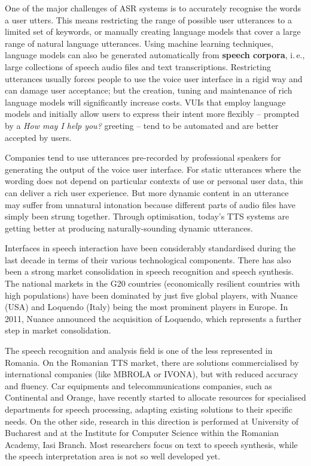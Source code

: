 \begin{multicols}{2}
One of the major challenges of ASR systems is to accurately recognise the words a user utters. This means restricting the range of possible user utterances to a limited set of keywords, or manually creating language models that cover a large range of natural language utterances. Using machine learning techniques, language models can also be generated automatically from \textbf{speech corpora}, i.\,e., large collections of speech audio files and text transcriptions. Restricting utterances usually forces people to use the voice user interface in a rigid way and can damage user acceptance; but the creation, tuning and maintenance of rich language models will significantly increase costs. VUIs that employ language models and initially allow users to express their intent more flexibly -- prompted by a \textit{How may I help you?} greeting -- tend to be automated and are better accepted by users.

Companies tend to use utterances pre-recorded by professional speakers for generating the output of the voice user interface. For static utterances where the wording does not depend on particular contexts of use or personal user data, this can deliver a rich user experience. But more dynamic content in an utterance may suffer from unnatural intonation because different parts of audio files have simply been strung together. Through optimisation, today’s TTS systems are getting better at producing naturally-sounding dynamic utterances.

Interfaces in speech interaction have been considerably standardised during the last decade in terms of their various technological components. There has also been a strong market consolidation in speech recognition and speech synthesis. The national markets in the G20 countries (economically resilient countries with high populations) have been dominated by just five global players, with Nuance (USA) and Loquendo (Italy) being the most prominent players in Europe. In 2011, Nuance announced the acquisition of Loquendo, which represents a further step in market consolidation.

The speech recognition and analysis field is one of the less represented in Romania. On the Romanian TTS market, there are solutions commercialised by international companies (like MBROLA or IVONA), but with reduced accuracy and fluency. Car equipments and telecommunications companies, such as Continental and Orange, have recently started to allocate resources for specialised departments for speech processing, adapting existing solutions to their specific needs. On the other side, research in this direction is performed at University of Bucharest and at the Institute for Computer Science within the Romanian Academy, Iasi Branch. Most researchers focus on text to speech synthesis, while the speech interpretation area is not so well developed yet. 


\end{multicols}
